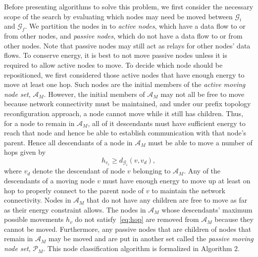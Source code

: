 \documentclass[10pt,conference]{IEEEtran}
\begin{document}
Before presenting algorithms to solve this problem, we first consider
the necessary scope of the search by evaluating which nodes may need
be moved between $\mathcal{G}_i$ and $\mathcal{G}_f$.  We partition
the nodes in to {\it active nodes}, which have a data flow to or from
other nodes, and {\it passive nodes}, which do not have a data flow to
or from other nodes.  Note that passive nodes may still act as relays
for other nodes' data flows.  To conserve energy, it is best to not
move passive nodes unless it is required to allow active nodes to
move.  To decide which node should be repositioned, we first
considered those active nodes that have enough energy to move at least
one hop.  Such nodes are the initial members of the {\it active moving
  node set}, $\mathcal{A}_M$.  However, the initial members of
$\mathcal{A}_M$ may not all be free to move because network
connectivity must be maintained, and under our prefix topology
reconfiguration approach, a node cannot move while it still has
children.
Thus, for a node to remain in $\mathcal{A}_M$, all of it
descendants must have sufficient energy to reach that node and hence
be able to establish communication with that node's parent.
Hence all descendants of a node in $\mathcal{A}_M$ must be able to
move a number of hops given by
\begin{equation}
\label{eq:hop}
 h_{v_{c}} \geq  d_{\mathcal{G}_{i}}(v,v_{d}),
\end{equation}
where $v_{d}$ denote the descendant of node $v$ belonging to
$\mathcal{A}_M$.
Any of the descendants of a moving node $v$ must have enough energy to
move up at least on hop to properly connect to the parent node of $v$
to maintain the network connectivity.  Nodes in $\mathcal{A}_M$ that
do not have any children are free to move as far as their energy
constraint allows.  The nodes in $\mathcal{A}_M$ whose descendants'
maximum possible movements $h_{v}$ do not satisfy~\autoref{eq:hop}
are removed from $\mathcal{A}_M$ because they cannot be moved.
Furthermore, any passive nodes that are children of nodes that remain
in $\mathcal{A}_M$ may be moved and are put in another set called the
{\it passive moving node set}, $\mathcal{P}_M$.  This node
classification algorithm is formalized in Algorithm 2.
\end{document}
